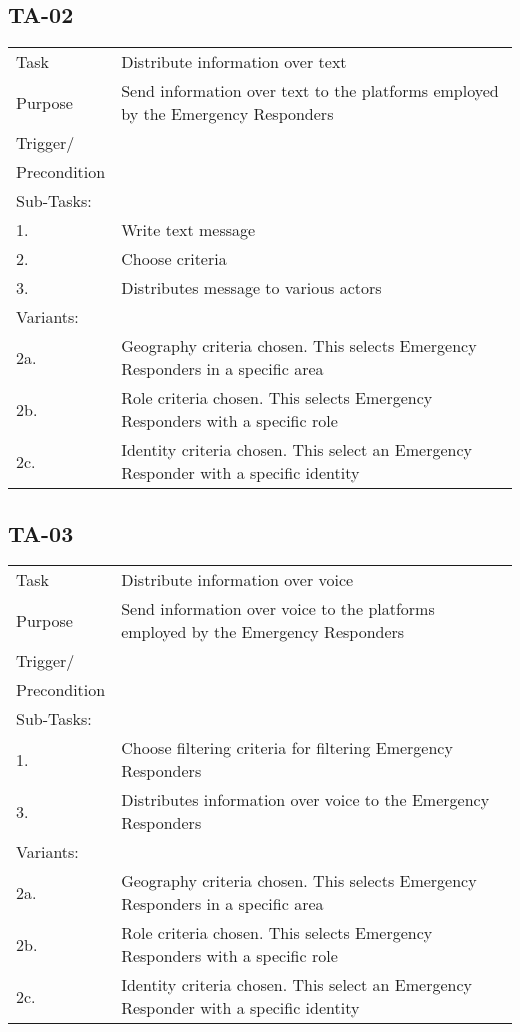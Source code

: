 \subsection{TA-02}
\begin{longtable}{| p{2.5cm}  | p{10cm} |  }
	\hline
	Task & Distribute information over text \\
	Purpose & Send information over text to the platforms employed by the Emergency Responders \\
	Trigger/ &  \\ Precondition &  \\
	\hline
	Sub-Tasks: & \\
	1. & Write text message\\
	2. & Choose criteria \\
	3. & Distributes message to various actors \\
	\hline
	Variants: & \\
	2a. & Geography criteria chosen. This selects Emergency Responders in a specific area \\
	2b. & Role criteria chosen. This selects Emergency Responders with a specific role\\
	2c. & Identity criteria chosen. This select an Emergency Responder with a specific identity \\
	\hline
\end{longtable}

\newpage
\subsection{TA-03}
\begin{longtable}{| p{2.5cm}  | p{10cm} |  }
	\hline
	Task & Distribute information over voice \\
	Purpose & Send information over voice to the platforms employed by the Emergency Responders \\
	Trigger/ &  \\ Precondition &  \\
	\hline
	Sub-Tasks: & \\
	1. & Choose filtering criteria for filtering Emergency Responders \\
	3. & Distributes information over voice to the Emergency Responders \\
	\hline
	Variants: & \\
	2a. & Geography criteria chosen. This selects Emergency Responders in a specific area \\
	2b. & Role criteria chosen. This selects Emergency Responders with a specific role\\
	2c. & Identity criteria chosen. This select an Emergency Responder with a specific identity \\
	\hline
\end{longtable}

